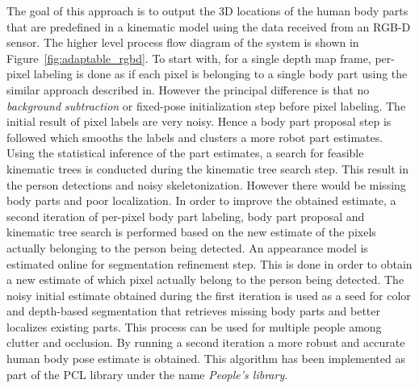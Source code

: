 The goal of this approach is to output the 3D locations of the human body parts that are predefined in a kinematic model using the data received from an RGB-D sensor. The higher level process flow diagram of the system is shown in Figure~\ref{fig:adaptable_rgbd}. To start with, for a single depth map frame, per-pixel labeling is done as if each pixel is belonging to a single body part using the similar approach described in\cite{shotton2013real}. However the principal difference is that no \emph{background subtraction} or fixed-pose initialization step before pixel labeling. The initial result of pixel labels are very noisy. Hence a body part proposal step is followed which smooths the labels and clusters a more robot part estimates. Using the statistical inference of the part estimates, a search for feasible kinematic trees is conducted during the kinematic tree search step. This result in the person detections and noisy skeletonization. However there would be missing body parts and poor localization. In order to improve the obtained estimate, a second iteration of per-pixel body part labeling, body part proposal and kinematic tree search is performed based on the new estimate of the pixels actually belonging to the person being detected. An appearance model is estimated online for segmentation refinement step. This is done in order to obtain a new estimate of which pixel actually belong to the person being detected. The noisy initial estimate obtained during the first iteration is used as a seed for color and depth-based segmentation that retrieves missing body parts and better localizes existing parts. This process can be used for multiple people among clutter and occlusion. By running a second iteration a more robust and accurate human body pose estimate is obtained. This algorithm has been implemented as part of the PCL\cite{rusu20113d} library under the name \emph{People's library}.

